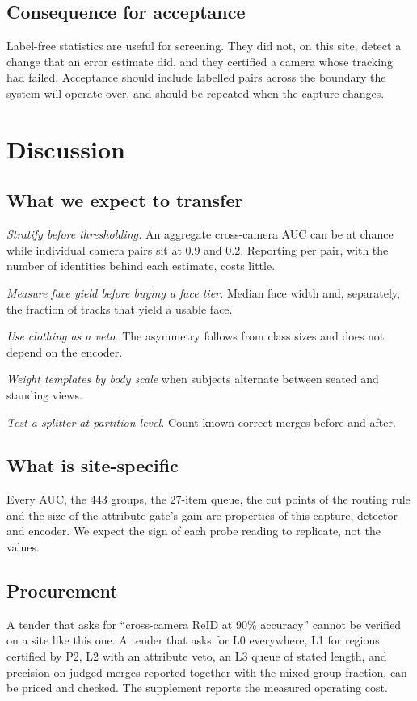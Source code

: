 \documentclass[journal]{IEEEtran}
\begin{document}
\subsection{Consequence for acceptance}
Label-free statistics are useful for screening. They did not, on this site, detect a change that an error estimate did, and they certified a camera whose tracking had failed. Acceptance should include labelled pairs across the boundary the system will operate over, and should be repeated when the capture changes.

\section{Discussion}
\subsection{What we expect to transfer}
\emph{Stratify before thresholding.} An aggregate cross-camera AUC can be at chance while individual camera pairs sit at 0.9 and 0.2. Reporting per pair, with the number of identities behind each estimate, costs little.

\emph{Measure face yield before buying a face tier.} Median face width and, separately, the fraction of tracks that yield a usable face.

\emph{Use clothing as a veto.} The asymmetry follows from class sizes and does not depend on the encoder.

\emph{Weight templates by body scale} when subjects alternate between seated and standing views.

\emph{Test a splitter at partition level.} Count known-correct merges before and after.

\subsection{What is site-specific}
Every AUC, the 443 groups, the 27-item queue, the cut points of the routing rule and the size of the attribute gate's gain are properties of this capture, detector and encoder. We expect the sign of each probe reading to replicate, not the values.

\subsection{Procurement}
A tender that asks for ``cross-camera ReID at 90\% accuracy'' cannot be verified on a site like this one. A tender that asks for L0 everywhere, L1 for regions certified by P2, L2 with an attribute veto, an L3 queue of stated length, and precision on judged merges reported together with the mixed-group fraction, can be priced and checked. The supplement reports the measured operating cost.
\end{document}
